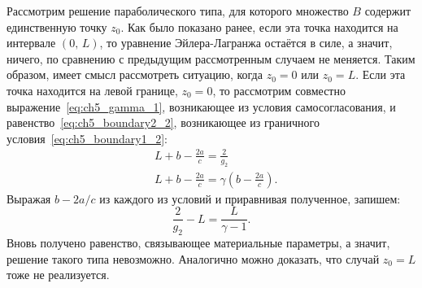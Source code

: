 Рассмотрим решение параболического типа, для которого множество $B$ содержит единственную точку $z_0$.
Как было показано ранее, если эта точка находится на интервале $(0,\, L)$, то уравнение Эйлера-Лагранжа остаётся в силе, а значит, ничего, по сравнению с предыдущим рассмотренным случаем не меняется.
Таким образом, имеет смысл рассмотреть ситуацию, когда $z_0 = 0$ или $z_0 = L$.
Если эта точка находится на левой границе, $z_0 = 0$, то рассмотрим совместно выражение~\eqref{eq:ch5_gamma_1}, возникающее из условия самосогласования, и равенство~\eqref{eq:ch5_boundary2_2}, возникающее из граничного условия~\eqref{eq:ch5_boundary1_2}:
\begin{subequations}
	\begin{align}
		&L+b-\frac{2a}{c} = \frac{2}{g_2}\\
		&L + b - \frac{2a}{c} = \gamma \left(b - \frac{2a}{c}\right).
	\end{align}
\end{subequations}
Выражая $b - 2a/c$ из каждого из условий и приравнивая полученное, запишем:
\begin{equation}
	\frac{2}{g_2} - L = \frac{L}{\gamma - 1}.
\end{equation}
Вновь получено равенство, связывающее материальные параметры, а значит, решение такого типа невозможно. Аналогично можно доказать, что случай $z_0 = L$ тоже не реализуется.

